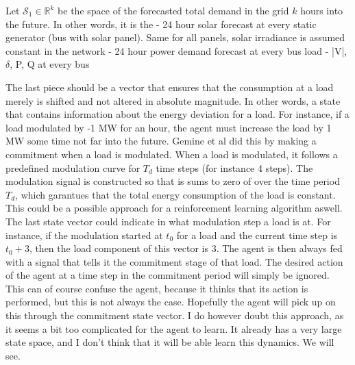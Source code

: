 \documentclass[class=book, crop=false]{standalone}
\begin{document}
Let $\mathcal{S}_{1} \in \mathbb{R}^{k}$ be the space of the forecasted total demand in the grid $k$ hours into the future. In other words, it is the 
- 24 hour solar forecast at every static generator (bus with solar panel). Same for all panels, solar irradiance is assumed constant in the network
- 24 hour power demand forecast at every bus load
- |V|, $\delta$, P, Q at every bus

The last piece should be a vector that ensures that the consumption at a load merely is shifted and not altered in absolute magnitude. In other words, a state that contains information about the energy deviation for a load. For instance, if a load modulated by -1 MW for an hour, the agent must increase the load by 1 MW some time not far into the future. Gemine et al did this by making a commitment when a load is modulated. When a load is modulated, it follows a predefined modulation curve for $T_{d}$ time steps (for instance 4 steps). The modulation signal is constructed so that is sums to zero of over the time period $T_{d}$, which garantues that the total energy consumption of the load is constant. This could be a possible approach for a reinforcement learning algorithm aswell. The last state vector could indicate in what modulation step a load is at. For instance, if the modulation started at $t_{0}$ for a load and the current time step is $t_{0} + 3$, then the load component of this vector is 3. The agent is then always fed with a signal that tells it the commitment stage of that load. The desired action of the agent at a time step in the commitment period will simply be ignored. This can of course confuse the agent, because it thinks that its action is performed, but this is not always the case. Hopefully the agent will pick up on this through the commitment state vector. I do however doubt this approach, as it seems a bit too complicated for the agent to learn. It already has a very large state space, and I don't think that it will be able learn this dynamics. We will see.
\end{document}

